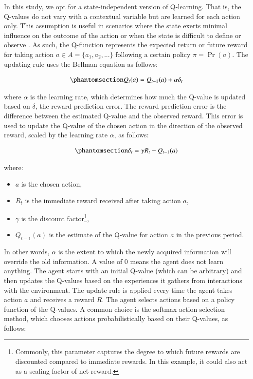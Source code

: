 \documentclass[
  number,
  preprint,
  3p,
  onecolumn]{elsarticle}
\begin{document}
In this study, we opt for a state-independent version of Q-learning.
That is, the Q-values do not vary with a contextual variable but are
learned for each action only. This assumption is useful in scenarios
where the state exerts minimal influence on the outcome of the action or
when the state is difficult to define or observe \citep{sutton2018}. As
such, the Q-function represents the expected return or future reward for
taking action \(a \in A = \{a_1,a_2,...\}\) following a certain policy
\(\pi = \Pr(a)\). The updating rule uses the Bellman equation as
follows:

\begin{equation}\phantomsection\label{eq-q-learn}{
Q_{t}(a) = Q_{t-1}(a) + \alpha \delta_t
}\end{equation}

where \(\alpha\) is the learning rate, which determines how much the
Q-value is updated based on \(\delta\), the reward prediction error. The
reward prediction error is the difference between the estimated Q-value
and the observed reward. This error is used to update the Q-value of the
chosen action in the direction of the observed reward, scaled by the
learning rate \(\alpha\), as follows:

\begin{equation}\phantomsection\label{eq-RPE}{
\delta_t = \gamma R_t - Q_{t-1}(a)
}\end{equation}

where:

\begin{itemize}
\item
  \(a\) is the chosen action,
\item
  \(R_t\) is the immediate reward received after taking action \(a\),
\item
  \(\gamma\) is the discount factor\footnote{Commonly, this parameter
    captures the degree to which future rewards are discounted compared
    to immediate rewards. In this example, it could also act as a
    scaling factor of net reward.},
\item
  \(Q_{t-1}(a)\) is the estimate of the Q-value for action \(a\) in the
  previous period.
\end{itemize}

In other words, \(\alpha\) is the extent to which the newly acquired
information will override the old information. A value of 0 means the
agent does not learn anything. The agent starts with an initial Q-value
(which can be arbitrary) and then updates the Q-values based on the
experiences it gathers from interactions with the environment. The
update rule is applied every time the agent takes action \(a\) and
receives a reward \(R\). The agent selects actions based on a policy
function of the Q-values. A common choice is the softmax action
selection method, which chooses actions probabilistically based on their
Q-values, as follows:
\end{document}
